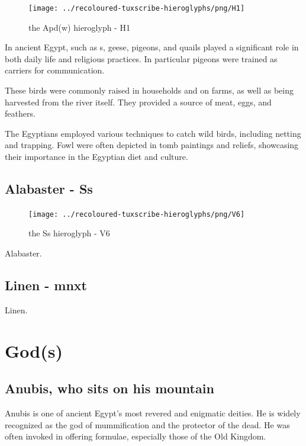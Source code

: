 \begin{figure} [H]
	\centering
	\texttt{[image: ../recoloured-tuxscribe-hieroglyphs/png/H1]}
	\caption{the Apd(w) hieroglyph - H1}
\end{figure}

In ancient Egypt,  such as s, geese, pigeons, and quails played a significant role in both daily life and religious practices. In particular pigeons were trained as carriers for communication.

These birds were commonly raised in households and on farms, as well as being harvested from the river itself. They provided a source of meat, eggs, and feathers.

The Egyptians employed various techniques to catch wild birds, including netting and trapping. Fowl were often depicted in tomb paintings and reliefs, showcasing their importance in the Egyptian diet and culture.

\subsection*{Alabaster - Ss}

\begin{figure} [H]
	\centering
	\texttt{[image: ../recoloured-tuxscribe-hieroglyphs/png/V6]}
	\caption{the Ss hieroglyph - V6}
\end{figure}

Alabaster.

\subsection*{Linen - mnxt}

Linen.

\section*{God(s)}

\subsection*{Anubis, who sits on his mountain}

Anubis is one of ancient Egypt's most revered and enigmatic deities. He is widely recognized as the god of mummification and the protector of the dead. He was often invoked in offering formulae, especially those of the Old Kingdom.

